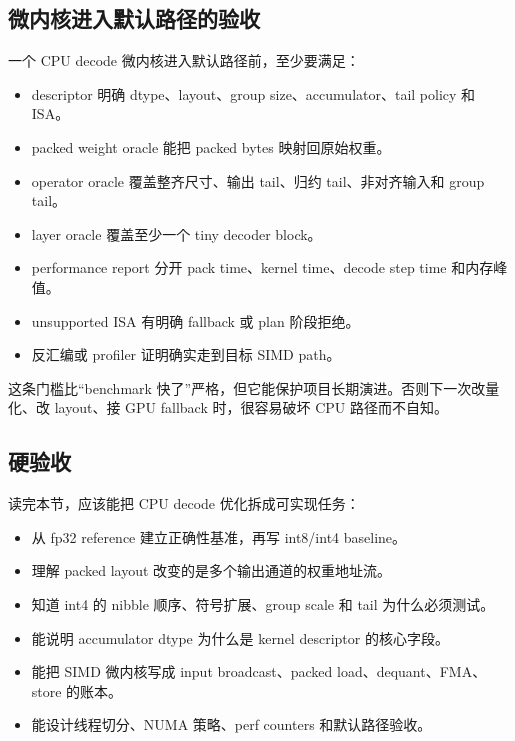 \subsection{微内核进入默认路径的验收}

一个 CPU decode 微内核进入默认路径前，至少要满足：

\begin{rubricbox}
\begin{itemize}
  \item descriptor 明确 dtype、layout、group size、accumulator、tail policy 和 ISA。
  \item packed weight oracle 能把 packed bytes 映射回原始权重。
  \item operator oracle 覆盖整齐尺寸、输出 tail、归约 tail、非对齐输入和 group tail。
  \item layer oracle 覆盖至少一个 tiny decoder block。
  \item performance report 分开 pack time、kernel time、decode step time 和内存峰值。
  \item unsupported ISA 有明确 fallback 或 plan 阶段拒绝。
  \item 反汇编或 profiler 证明确实走到目标 SIMD path。
\end{itemize}
\end{rubricbox}

这条门槛比“benchmark 快了”严格，但它能保护项目长期演进。否则下一次改量化、改 layout、接 GPU fallback 时，很容易破坏 CPU 路径而不自知。

\subsection{硬验收}

读完本节，应该能把 CPU decode 优化拆成可实现任务：

\begin{itemize}
  \item 从 fp32 reference 建立正确性基准，再写 int8/int4 baseline。
  \item 理解 packed layout 改变的是多个输出通道的权重地址流。
  \item 知道 int4 的 nibble 顺序、符号扩展、group scale 和 tail 为什么必须测试。
  \item 能说明 accumulator dtype 为什么是 kernel descriptor 的核心字段。
  \item 能把 SIMD 微内核写成 input broadcast、packed load、dequant、FMA、store 的账本。
  \item 能设计线程切分、NUMA 策略、perf counters 和默认路径验收。
\end{itemize}
